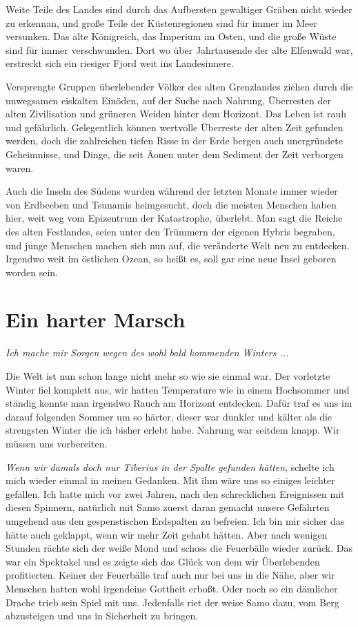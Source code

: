 \documentclass[11pt]{wbzine}
\begin{document}
\begin{multicols}{2}
Weite Teile des Landes sind durch das Aufbersten gewaltiger Gräben
nicht wieder zu erkennan, und große Teile der Küstenregionen sind für
immer im Meer versunken. Das alte Königreich, das Imperium im Osten,
und die große Wüste sind für immer verschwunden. Dort wo über
Jahrtausende der alte Elfenwald war, erstreckt sich ein riesiger Fjord weit
ins Landesinnere.

Versprengte Gruppen überlebender Völker des alten Grenzlandes ziehen
durch die unwegsamen eiskalten Einöden, auf der Suche nach Nahrung,
Überresten der alten Zivilisation und grüneren Weiden hinter dem
Horizont. Das Leben ist rauh und gefährlich. Gelegentlich können
wertvolle Überreste der alten Zeit gefunden werden, doch die
zahlreichen tiefen Risse in der Erde bergen auch unergründete
Geheimnisse, und Dinge, die seit Äonen unter dem Sediment
der Zeit verborgen waren.

Auch die Inseln des Südens wurden während der letzten Monate immer
wieder von Erdbeeben und Tsunamis heimgesucht, doch die meisten
Menschen haben hier, weit weg vom Epizentrum der Katastrophe,
überlebt. Man sagt die Reiche des alten Festlandes, seien unter den
Trümmern der eigenen Hybris begraben, und junge Menschen machen sich
nun auf, die veränderte Welt neu zu entdecken. Irgendwo weit im
östlichen Ozean, so heißt es, soll gar eine neue Insel geboren
worden sein.

\section{Ein harter Marsch}

\textit{Ich mache mir Sorgen wegen des wohl bald kommenden Winters
...}

Die Welt ist nun schon lange nicht mehr so wie sie einmal war. Der
vorletzte Winter fiel komplett aus, wir hatten Temperature wie in
einem Hochsommer und ständig konnte man irgendwo Rauch am Horizont
entdecken. Dafür traf es uns im darauf folgenden Sommer um so
härter, dieser war dunkler und kälter als die strengsten Winter die
ich bisher erlebt habe. Nahrung war seitdem knapp. Wir müssen uns
vorbereiten.


\textit{Wenn wir damals doch nur Tiberius in der Spalte gefunden
hätten}, schelte ich mich wieder einmal in meinen Gedanken. Mit ihm
wäre uns so einiges leichter gefallen. Ich hatte mich vor zwei
Jahren, nach den schrecklichen Ereignissen mit diesen Spinnern,
natürlich mit Samo zuerst daran gemacht unsere Gefährten umgehend
aus den gespenstischen Erdspalten zu befreien. Ich bin mir sicher
das hätte auch geklappt, wenn wir mehr Zeit gehabt hätten. Aber
nach wenigen Stunden rächte sich der weiße Mond und schoss die
Feuerbälle wieder zurück. Das war ein Spektakel und es zeigte sich
das Glück von dem wir Überlebenden profitierten. Keiner der
Feuerbälle traf auch nur bei uns in die Nähe, aber wir Menschen
hatten wohl irgendeine Gottheit erboßt. Oder noch so ein dämlicher
Drache trieb sein Spiel mit uns. Jedenfalls riet der weise Samo
dazu, vom Berg abzusteigen und uns in Sicherheit zu bringen. 



\end{multicols}
\end{document}
